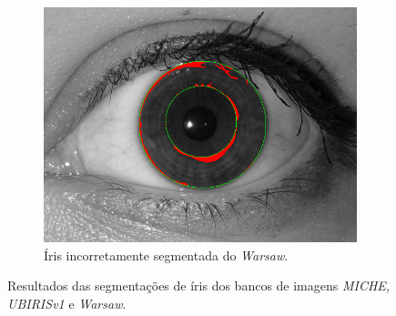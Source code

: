 \begin{figure}[H]
\begin{subfigure}{0.25\textwidth}
  \includegraphics[width=\linewidth]{img/Resultados/warsaw/warsaw_seg_ruim.jpg}
  \caption{Íris incorretamente segmentada do \textit{\acrshort{Warsaw}}.}
\end{subfigure}
\caption{Resultados das segmentações de íris dos bancos de imagens \textit{MICHE, UBIRISv1} e \textit{\acrshort{Warsaw}}.}
\label{fig:experimentos:segmentacoes:todos}
\end{figure}

